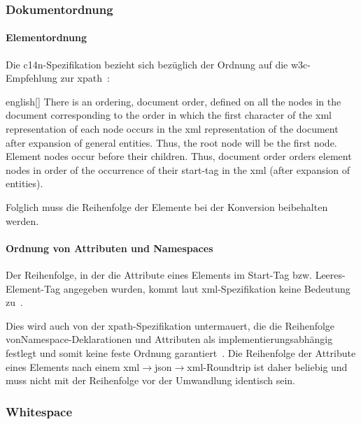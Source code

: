 \subsubsection{Dokumentordnung}

\paragraph{Elementordnung}

Die \acrshort{c14n}-Spezifikation bezieht sich bezüglich der Ordnung auf die \acrshort{w3c}-Empfehlung zur \acrfull{xpath}~\cite[Abschn.~2.2]{c14n}:

\begin{foreigndisplayquote}{english}[{\cite[Abschn.~5]{xpath}}]
    There is an ordering, document order, defined on all the nodes in the document corresponding to the order in which the first character of the \acrshort{xml} representation of each node occurs in the \acrshort{xml} representation of the document after expansion of general entities. Thus, the root node will be the first node. Element nodes occur before their children. Thus, document order orders element nodes in order of the occurrence of their start-tag in the \acrshort{xml} (after expansion of entities).
\end{foreigndisplayquote}

Folglich muss die Reihenfolge der Elemente bei der Konversion beibehalten werden.

\paragraph{Ordnung von Attributen und Namespaces}

Der Reihenfolge, in der die Attribute eines Elements im Start-Tag bzw. Leeres-Element-Tag angegeben wurden, kommt laut \acrshort{xml}-Spezi\-fikation keine Bedeutung zu~\cite[Abschn.~3.1]{xml}.

Dies wird auch von der \acrshort{xpath}-Spezifikation untermauert, die die Reihenfolge von\linebreak{}Namespace-Deklarationen und Attributen als implementierungsabhängig festlegt und somit keine feste Ordnung garantiert~\cite[Abschn.~5]{xpath}.
Die Reihenfolge der Attribute eines Elements nach einem \acrshort{xml}$\rightarrow$\acrshort{json}$\rightarrow$\acrshort{xml}-Roundtrip ist daher beliebig und muss nicht mit der Reihenfolge vor der Umwandlung identisch sein.

\subsubsection{Whitespace}

